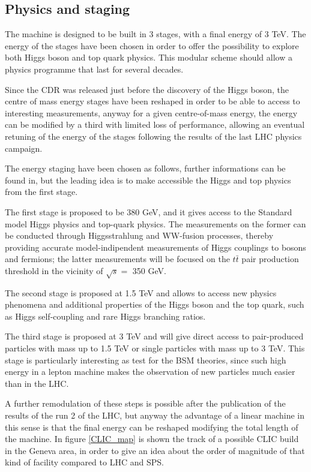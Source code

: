\subsection{Physics and staging}

The machine is designed to be built in 3 stages, with a final energy of 3 TeV. The energy of the stages have been chosen in order to offer the possibility to explore both Higgs boson and top quark physics. This modular scheme should allow a physics programme that last for several decades.

Since the CDR\cite{CLIC:cdr} was released just before the discovery of the Higgs boson, the centre of mass energy stages have been reshaped in order to be able to access to interesting measurements, anyway for a given centre-of-mass energy, the energy can be modified by a third with limited loss of performance\cite{CLIC:cdrVol3}, allowing an eventual retuning of the energy of the stages following the results of the last LHC physics campaign.

The energy staging have been chosen as follows, further informations can be found in\cite{CLIC:staging2016,Bozovic-Jelisavcic:2160172}, but the leading idea is to make accessible the Higgs and top physics from the first stage.

The first stage is proposed to be 380 GeV, and it gives access to the Standard model Higgs physics and top-quark physics. The measurements on the former can be conducted through Higgsstrahlung and WW-fusion processes, thereby providing accurate model-indipendent measurements of Higgs couplings to bosons and fermions\cite{Roloff:2210491}; the latter measurements will be focused on the $t\bar{t}$ pair production threshold in the vicinity of $\sqrt{s} = $ 350 GeV.

The second stage is proposed at 1.5 TeV and allows to access new physics phenomena and additional properties of the Higgs boson and the top quark, such as Higgs self-coupling and rare Higgs branching ratios.

The third stage is proposed at 3 TeV and will give direct access to pair-produced particles with mass up to 1.5 TeV or single particles with mass up to 3 TeV. This stage is particularly interesting as test for the BSM theories, since such high energy in a lepton machine makes the observation of new particles much easier than in the LHC.

A further remodulation of these steps is possible after the publication of the results of the run 2 of the LHC, but anyway the advantage of a linear machine in this sense is that the final energy can be reshaped modifying the total length of the machine. In figure \ref{CLIC_map} is shown the track of a possible CLIC build in the Geneva area, in order to give an idea about the order of magnitude of that kind of facility compared to LHC and SPS.

